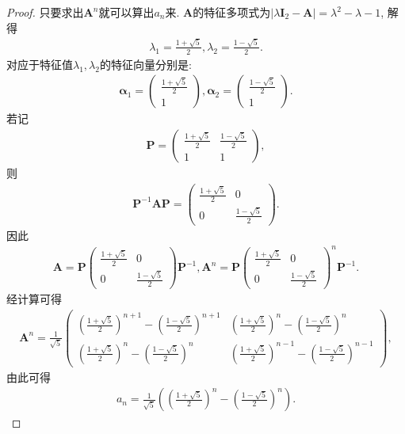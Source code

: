 \documentclass[../../main.tex]{subfiles}
\begin{document}
\begin{proof}
只要求出\(\boldsymbol{A}^{n}\)就可以算出\(a_{n}\)来. \(\boldsymbol{A}\)的特征多项式为\(\vert\lambda\boldsymbol{I}_{2}-\boldsymbol{A}\vert=\lambda^{2}-\lambda - 1\), 解得
\begin{align*}
\lambda_{1}=\frac{1 + \sqrt{5}}{2},\lambda_{2}=\frac{1 - \sqrt{5}}{2}.
\end{align*}
对应于特征值\(\lambda_{1},\lambda_{2}\)的特征向量分别是:
\begin{align*}
\boldsymbol{\alpha}_{1}=\begin{pmatrix}
\frac{1 + \sqrt{5}}{2}\\
1
\end{pmatrix},\boldsymbol{\alpha}_{2}=\begin{pmatrix}
\frac{1 - \sqrt{5}}{2}\\
1
\end{pmatrix}.
\end{align*}
若记
\begin{align*}
\boldsymbol{P}=\begin{pmatrix}
\frac{1 + \sqrt{5}}{2}&\frac{1 - \sqrt{5}}{2}\\
1&1
\end{pmatrix},
\end{align*}
则
\begin{align*}
\boldsymbol{P}^{-1}\boldsymbol{AP}=\begin{pmatrix}
\frac{1 + \sqrt{5}}{2}&0\\
0&\frac{1 - \sqrt{5}}{2}
\end{pmatrix}.
\end{align*}
因此
\begin{align*}
\boldsymbol{A}=\boldsymbol{P}\begin{pmatrix}
\frac{1 + \sqrt{5}}{2}&0\\
0&\frac{1 - \sqrt{5}}{2}
\end{pmatrix}\boldsymbol{P}^{-1},\boldsymbol{A}^{n}=\boldsymbol{P}\begin{pmatrix}
\frac{1 + \sqrt{5}}{2}&0\\
0&\frac{1 - \sqrt{5}}{2}
\end{pmatrix}^{n}\boldsymbol{P}^{-1}.
\end{align*}
经计算可得
\begin{align*}
\boldsymbol{A}^{n}=\frac{1}{\sqrt{5}}\begin{pmatrix}
\left(\frac{1 + \sqrt{5}}{2}\right)^{n + 1}-\left(\frac{1 - \sqrt{5}}{2}\right)^{n + 1}&\left(\frac{1 + \sqrt{5}}{2}\right)^{n}-\left(\frac{1 - \sqrt{5}}{2}\right)^{n}\\
\left(\frac{1 + \sqrt{5}}{2}\right)^{n}-\left(\frac{1 - \sqrt{5}}{2}\right)^{n}&\left(\frac{1 + \sqrt{5}}{2}\right)^{n - 1}-\left(\frac{1 - \sqrt{5}}{2}\right)^{n - 1}
\end{pmatrix},
\end{align*}
由此可得
\begin{align*}
a_{n}=\frac{1}{\sqrt{5}}\left(\left(\frac{1 + \sqrt{5}}{2}\right)^{n}-\left(\frac{1 - \sqrt{5}}{2}\right)^{n}\right).
\end{align*}

\end{proof}
\end{document}
